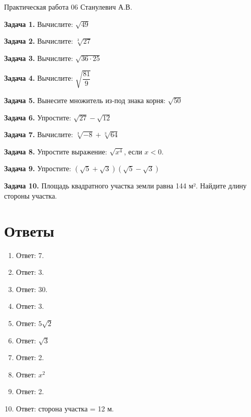 \documentclass{umk-matematika}
\begin{document}
\maketitlepage
    {Практическая работа 06}
    {}
    {Станулевич А.В.}

\textbf{Задача 1.} Вычислите: $\sqrt{49}$\par\vspace{10pt}
\textbf{Задача 2.} Вычислите: $\sqrt[3]{27}$\par\vspace{10pt}
\textbf{Задача 3.} Вычислите: $\sqrt{36 \cdot 25}$\par\vspace{10pt}
\textbf{Задача 4.} Вычислите: $\sqrt{\dfrac{81}{9}}$\par\vspace{10pt}
\textbf{Задача 5.} Вынесите множитель из-под знака корня: $\sqrt{50}$\par\vspace{10pt}
\textbf{Задача 6.} Упростите: $\sqrt{27} - \sqrt{12}$\par\vspace{10pt}
\textbf{Задача 7.} Вычислите: $\sqrt[3]{-8} + \sqrt[3]{64}$\par\vspace{10pt}
\textbf{Задача 8.} Упростите выражение: $\sqrt{x^4}$, если $x < 0$.\par\vspace{10pt}
\textbf{Задача 9.} Упростите: $(\sqrt{5} + \sqrt{3})(\sqrt{5} - \sqrt{3})$\par\vspace{10pt}
\textbf{Задача 10.} Площадь квадратного участка земли равна 144 м². Найдите длину стороны участка.\par\vspace{10pt}
\newpage
\section*{Ответы}

\begin{enumerate}
  \item Ответ: 7.
  \item Ответ: 3.
  \item Ответ: 30.
  \item Ответ: 3.
  \item Ответ: $5\sqrt{2}$
  \item Ответ: $\sqrt{3}$
  \item Ответ: 2.
  \item Ответ: $x^2$
  \item Ответ: 2.
  \item Ответ: сторона участка = 12 м.
\end{enumerate}
\end{document}
